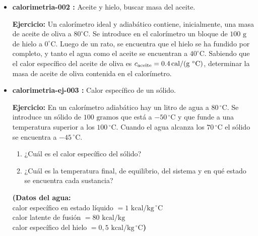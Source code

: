 \documentclass[a4paper,11pt,dvipsnames]{article}
\begin{document}
\begin{itemize}
\begin{center}
\begin{minipage}{0.60\linewidth}
\begin{center}
\begin{tikzpicture}[scale=1.2]
\end{tikzpicture}
\end{center}

\end{minipage}
\end{center}




\item \textbf{calorimetria-002 :} Aceite y hielo, buscar masa del aceite. \par\medskip

\begin{center}
\begin{minipage}{0.60\linewidth}    
\textbf{Ejercicio:} Un calorímetro ideal y adiabático contiene, inicialmente, una masa de aceite de oliva a $80^\circ\text{C}$. Se introduce en el calorímetro un bloque de $100\text{ g}$ de hielo a $0^\circ\text{C}$. Luego de un rato, se encuentra que el hielo se ha fundido por completo, y tanto el agua como el aceite se encuentran a $40^\circ\text{C}$. Sabiendo que el calor específico del aceite de oliva es $c_\text{aceite} = 0.4\textrm{\,cal/(g $^\circ$C)}$, determinar la masa de aceite de oliva contenida en el calorímetro.
\end{minipage}
\end{center}

\item \textbf{calorimetria-ej-003 :} Calor específico de un sólido. \par\medskip

\begin{center}
\begin{minipage}{0.60\linewidth}    

\textbf{Ejercicio:} En un calorímetro adiabático hay un litro de agua a $80\,^{\circ}\text{C}$. Se introduce un sólido de $100\text{ gramos}$ que está a $-50\,^{\circ}\text{C}$ y que funde a una temperatura superior a los $100\,^{\circ}\text{C}$. Cuando el agua alcanza los $70\,^{\circ}\text{C}$ el sólido se encuentra a $-45\,^{\circ}\text{C}$.

\begin{enumerate}
    \item[\textbf{a)}] ¿Cuál es el calor específico del sólido?
    \item[\textbf{b)}] ¿Cuál es la temperatura final, de equilibrio, del sistema y en qué estado se encuentra cada sustancia?
\end{enumerate}


\noindent\textbf{(Datos del agua:} \\
calor específico en estado líquido $= 1\text{ kcal/kg}\,^{\circ}\text{C}$ \\
calor latente de fusión $= 80\text{ kcal/kg}$ \\
calor específico del hielo $= 0,5\text{ kcal/kg}\,^{\circ}\text{C}$\textbf{)}


\end{minipage}
\end{center}
\end{itemize}
\end{document}
